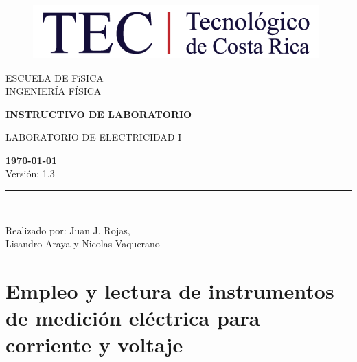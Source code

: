 \documentclass[12pt,letterpaper]{report}
\begin{document}
\begin{titlepage}

\begin{center}
\vspace*{1in}
\begin{figure}[htb]
\begin{center}
\includegraphics[width=11cm]{fig/logo.png}
\end{center}
\end{figure}
\vspace*{0.4in}
\begin{Large}
ESCUELA DE FíSICA\\
\vspace*{0.15in}
INGENIERÍA FÍSICA\\
\vspace*{0.8in}
\end{Large}
\vspace*{0.2in}
\begin{Large}
\textbf{INSTRUCTIVO DE LABORATORIO} \\
\end{Large}
\vspace*{0.3in}
\begin{large}
LABORATORIO DE ELECTRICIDAD I\\
\end{large}
\vspace*{2.5in}
\begin{Large}
\textbf{\today}\\
Versión: 1.3\\
\end{Large}
\rule{80mm}{0.1mm}\\
\vspace*{0.1in}
\begin{large}
Realizado por: Juan J. Rojas, \\
Lisandro Araya y Nicolas Vaquerano\\
\end{large}
\end{center}

\end{titlepage}

\tableofcontents

\chapter{Empleo y lectura de instrumentos de medición eléctrica para corriente y voltaje}
\end{document}
